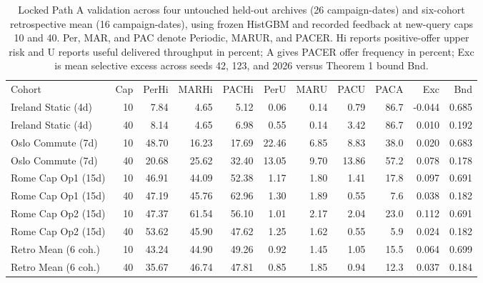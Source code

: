 \begin{table}[!ht]
\centering\small
\caption{Locked Path A validation across four untouched held-out archives (26 campaign-dates) and six-cohort retrospective mean (16 campaign-dates), using frozen HistGBM and recorded feedback at new-query caps 10 and 40. Per, MAR, and PAC denote Periodic, MARUR, and PACER. Hi reports positive-offer upper risk and U reports useful delivered throughput in percent; A gives PACER offer frequency in percent; Exc is mean selective excess across seeds 42, 123, and 2026 versus Theorem 1 bound Bnd.}
\begin{tabular}{lrrrrrrrrrr}
\hline
Cohort & Cap & PerHi & MARHi & PACHi & PerU & MARU & PACU & PACA & Exc & Bnd \\
Ireland Static (4d) & 10 & 7.84 & 4.65 & 5.12 & 0.06 & 0.14 & 0.79 & 86.7 & -0.044 & 0.685 \\
Ireland Static (4d) & 40 & 8.14 & 4.65 & 6.98 & 0.55 & 0.14 & 3.42 & 86.7 & 0.010 & 0.192 \\
Oslo Commute (7d) & 10 & 48.70 & 16.23 & 17.69 & 22.46 & 6.85 & 8.83 & 38.0 & 0.020 & 0.683 \\
Oslo Commute (7d) & 40 & 20.68 & 25.62 & 32.40 & 13.05 & 9.70 & 13.86 & 57.2 & 0.078 & 0.178 \\
Rome Cap Op1 (15d) & 10 & 46.91 & 44.09 & 52.38 & 1.17 & 1.80 & 1.41 & 17.8 & 0.097 & 0.691 \\
Rome Cap Op1 (15d) & 40 & 47.19 & 45.76 & 62.96 & 1.30 & 1.89 & 0.55 & 7.6 & 0.038 & 0.182 \\
Rome Cap Op2 (15d) & 10 & 47.37 & 61.54 & 56.10 & 1.01 & 2.17 & 2.04 & 23.0 & 0.112 & 0.691 \\
Rome Cap Op2 (15d) & 40 & 53.62 & 45.90 & 47.62 & 1.25 & 1.62 & 0.55 & 5.9 & 0.024 & 0.182 \\
Retro Mean (6 coh.) & 10 & 43.24 & 44.90 & 49.26 & 0.92 & 1.45 & 1.05 & 15.5 & 0.064 & 0.699 \\
Retro Mean (6 coh.) & 40 & 35.67 & 46.74 & 47.81 & 0.85 & 1.85 & 0.94 & 12.3 & 0.037 & 0.184 \\
\hline
\end{tabular}
\end{table}
